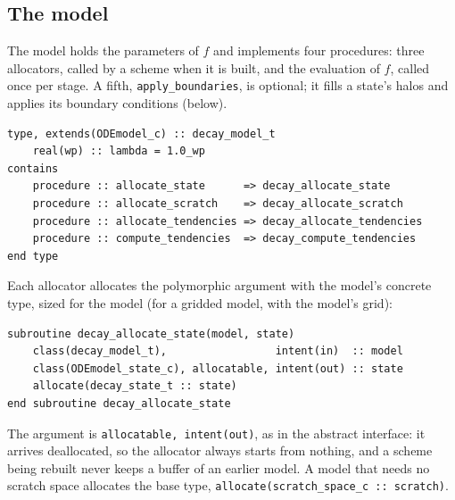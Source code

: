 \documentclass[11pt,a4paper]{article}
\newcommand{\code}[1]{\texttt{#1}}
\begin{document}
\subsection{The model}

The model holds the parameters of $f$ and implements four procedures: three
allocators, called by a scheme when it is built, and the evaluation of $f$,
called once per stage. A fifth, \code{apply\_boundaries}, is optional; it fills a
state's halos and applies its boundary conditions (below).
\begin{lstlisting}
type, extends(ODEmodel_c) :: decay_model_t
    real(wp) :: lambda = 1.0_wp
contains
    procedure :: allocate_state      => decay_allocate_state
    procedure :: allocate_scratch    => decay_allocate_scratch
    procedure :: allocate_tendencies => decay_allocate_tendencies
    procedure :: compute_tendencies  => decay_compute_tendencies
end type
\end{lstlisting}
Each allocator allocates the polymorphic argument with the model's concrete
type, sized for the model (for a gridded model, with the model's grid):
\begin{lstlisting}
subroutine decay_allocate_state(model, state)
    class(decay_model_t),                 intent(in)  :: model
    class(ODEmodel_state_c), allocatable, intent(out) :: state
    allocate(decay_state_t :: state)
end subroutine decay_allocate_state
\end{lstlisting}
The argument is \code{allocatable, intent(out)}, as in the abstract
interface: it arrives deallocated, so the allocator always starts from
nothing, and a scheme being rebuilt never keeps a buffer of an earlier model.
A model that needs no scratch space allocates the base type,
\code{allocate(scratch\_space\_c :: scratch)}.
\end{document}
